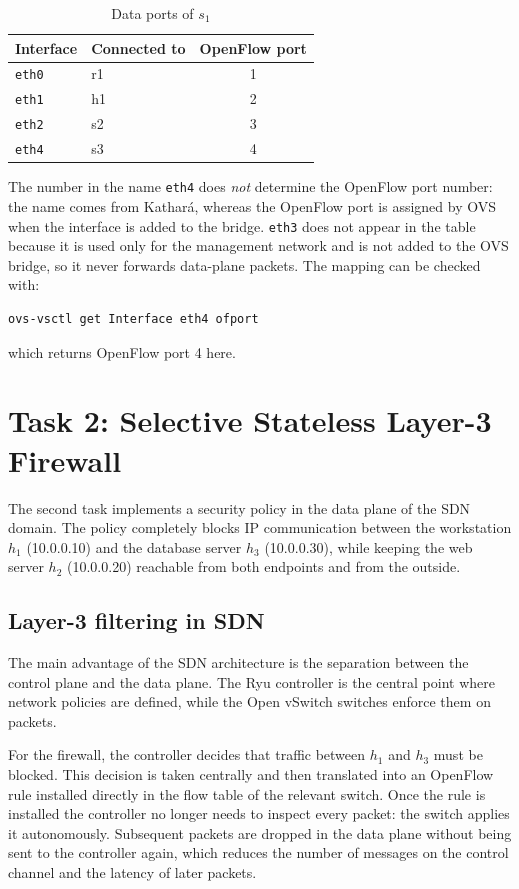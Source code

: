 \documentclass[11pt,a4paper]{article}
\newcommand{\code}[1]{\texttt{#1}}
\begin{document}
\begin{table}[H]
\centering
\begin{tabular}{llc}
\toprule
Interface & Connected to & OpenFlow port\\
\midrule
\code{eth0} & r1 & 1\\
\code{eth1} & h1 & 2\\
\code{eth2} & s2 & 3\\
\code{eth4} & s3 & 4\\
\bottomrule
\end{tabular}
\caption{Data ports of $s_1$}
\end{table}

The number in the name \code{eth4} does \emph{not} determine the OpenFlow port
number: the name comes from Kathar\'a, whereas the OpenFlow port is assigned by
OVS when the interface is added to the bridge. \code{eth3} does not appear in
the table because it is used only for the management network and is not added to
the OVS bridge, so it never forwards data-plane packets. The mapping can be
checked with:
\begin{lstlisting}[style=sh]
ovs-vsctl get Interface eth4 ofport
\end{lstlisting}
which returns OpenFlow port 4 here.

\section{Task 2: Selective Stateless Layer-3 Firewall}
The second task implements a security policy in the data plane of the SDN
domain. The policy completely blocks IP communication between the workstation
$h_1$ (10.0.0.10) and the database server $h_3$ (10.0.0.30), while keeping the
web server $h_2$ (10.0.0.20) reachable from both endpoints and from the outside.

\subsection{Layer-3 filtering in SDN}
The main advantage of the SDN architecture is the separation between the control
plane and the data plane. The Ryu controller is the central point where network
policies are defined, while the Open vSwitch switches enforce them on packets.

For the firewall, the controller decides that traffic between $h_1$ and $h_3$
must be blocked. This decision is taken centrally and then translated into an
OpenFlow rule installed directly in the flow table of the relevant switch. Once
the rule is installed the controller no longer needs to inspect every packet:
the switch applies it autonomously. Subsequent packets are dropped in the data
plane without being sent to the controller again, which reduces the number of
messages on the control channel and the latency of later packets.
\end{document}
